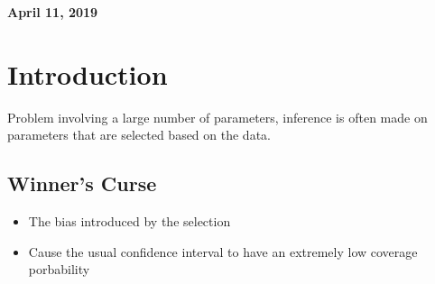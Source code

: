 \documentclass[11pt]{article}
\begin{document}
%

\newcommand{\Ito}{$It\hat{o}$'$s~Lemma$}

\newcommand\ind{\stackrel{\rm ind}{\sim}}
\newcommand\iid{\stackrel{\rm iid}{\sim}}
\renewcommand\c{\mathbf{c}}
\newcommand\y{\mathbf{y}}
\newcommand\z{\mathbf{z}}
\renewcommand\P{\mathbf{P}}
\newcommand\W{\mathbf{W}}
\newcommand\X{\mathbf{X}}
\newcommand\Y{\mathbf{Y}}
\newcommand\Z{\mathbf{Z}}
\newcommand\J{{\cal J}}
\newcommand\B{{\cal B}}
\newcommand\K{{\cal K}}
\newcommand\N{{\rm N}}
\newcommand\bs{\boldsymbol}
\newcommand\bth{\bs\theta}
\newcommand\bbe{\bs\beta}
\renewcommand\*{^\star}

\def\spacingset#1{\renewcommand{\baselinestretch}%
{#1}\small\normalsize} \spacingset{1}



  \bigskip
  \bigskip
  \bigskip
  \begin{center}
    {\LARGE\bf April 11, 2019 }
  \end{center}
  \medskip



\spacingset{1.45}








\section{Introduction}
Problem involving a large number of parameters, inference is often made on parameters that are selected based on the data.

\subsection{Winner's Curse}
\begin{itemize}
	\item The bias introduced by the selection
	\item Cause the usual confidence interval to have an extremely low coverage porbability
\end{itemize}
\end{document}
